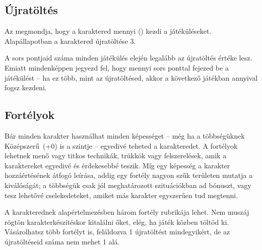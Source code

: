 \subsection{Újratöltés}

Az  megmondja, hogy a karaktered mennyi  () kezdi a játéküléseket. Alapállapotban a karaktered újratöltése 3.

A sors pontjaid száma minden játékülés elején legalább az újratöltés értéke lesz. Emiatt mindenképpen jegyezd fel, hogy mennyi sors ponttal fejezed be a játékülést – ha ez több, mint az újratöltésed, akkor a következő játékban annyival fogsz kezdeni.


\subsection{Fortélyok}

Bár minden karakter használhat minden képességet – még ha a többségüknek Középszerű~(+0) is a szintje –  egyedivé teheted a karakteredet. A fortélyok lehetnek menő vagy titkos technikák, trükkök vagy felszerelések, amik a karaktereket egyedivé és érdekesebbé teszik. Míg egy képesség a karakter hozzáértésének átfogó leírása, addig egy fortély nagyon szűk területen mutatja a kiválóságát; a többségük csak jól meghatározott szituációkban ad bónuszt, vagy tesz lehetővé cselekedeteket, amiket más karakter egyszerűen tud megtenni.

A karakterednek alapértelmezésben három fortély rubrikája lehet. Nem muszáj rögtön karakterkészítéskor kitalálni őket, elég, ha játék közben töltöd ki. Vásárolhatsz több fortélyt is, feláldozva 1 újratöltést mindegyikért, de az újratöltéseid száma nem mehet 1 alá.
